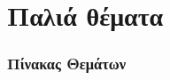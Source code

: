 \documentclass[11pt,a4paper,titlepage,fleqn]{article}
\begin{document}
	
	

	
\part{Παλιά θέματα}

\section{Πίνακας Θεμάτων}
\newcommand\rownumber{\stepcounter{magicrownumbers}\arabic{magicrownumbers}}
\end{document}
